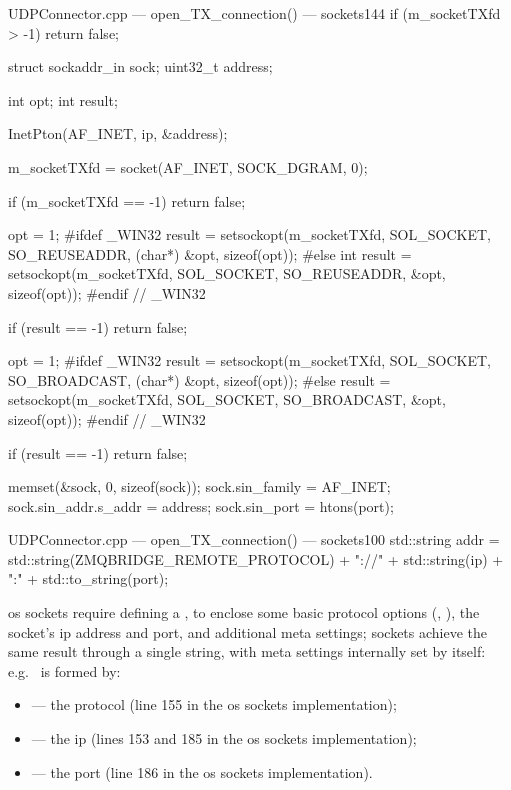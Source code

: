 \begin{codelist}{UDPConnector.cpp --- open\_TX\_connection() ---  sockets}{144}
    if (m_socketTXfd > -1)
        return false;

    struct sockaddr_in sock;
    uint32_t address;

    int opt;
    int result;

    InetPton(AF_INET, ip, &address);

    m_socketTXfd = socket(AF_INET, SOCK_DGRAM, 0);

    if (m_socketTXfd == -1) {
        return false;
    }

    opt = 1;
#ifdef _WIN32
    result = setsockopt(m_socketTXfd, SOL_SOCKET, SO_REUSEADDR, (char*) &opt, sizeof(opt));
#else
    int result = setsockopt(m_socketTXfd, SOL_SOCKET, SO_REUSEADDR, &opt, sizeof(opt));
#endif  // _WIN32

    if (result == -1) {
        return false;
    }

    opt = 1;
#ifdef _WIN32
    result = setsockopt(m_socketTXfd, SOL_SOCKET, SO_BROADCAST, (char*) &opt, sizeof(opt));
#else
    result = setsockopt(m_socketTXfd, SOL_SOCKET, SO_BROADCAST, &opt, sizeof(opt));
#endif  // _WIN32

    if (result == -1) {
        return false;
    }

    memset(&sock, 0, sizeof(sock));
    sock.sin_family      = AF_INET;
    sock.sin_addr.s_addr = address;
    sock.sin_port        = htons(port);
\end{codelist}

\begin{codelist}{UDPConnector.cpp --- open\_TX\_connection() ---  sockets}{100}
	std::string addr = std::string(ZMQBRIDGE_REMOTE_PROTOCOL) + "://" + std::string(ip) + ":" + std::to_string(port);
\end{codelist}

\FLOATnoindent \gls{os} sockets require defining a , to enclose some basic protocol options (, ), the socket's \gls{ip} address and port, and additional meta settings;  sockets achieve the same result through a single string, with meta settings internally set by  itself: e.g.\  is formed by:

\begin{itemize}
	\item {} --- the protocol (line \num{155} in the \gls{os} sockets implementation);
	\item {} --- the \gls{ip} (lines \num{153} and \num{185} in the \gls{os} sockets implementation);
	\item {} --- the port (line \num{186} in the \gls{os} sockets implementation).
\end{itemize}

